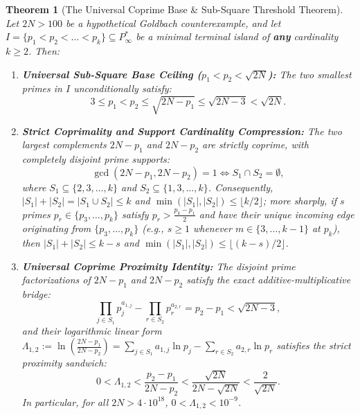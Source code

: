 \documentclass[11pt,a4paper]{article}
\newtheorem{theorem}{Theorem}[section]
\theoremstyle{definition}
\begin{document}
\begin{theorem}[The Universal Coprime Base \& Sub-Square Threshold Theorem]
\label{thm:universal_coprime_base}
Let $2N > 100$ be a hypothetical Goldbach counterexample, and let $I = \{p_1 < p_2 < \dots < p_k\} \subseteq P^*_\infty$ be a minimal terminal island of \textbf{any} cardinality $k \ge 2$. Then:
\begin{enumerate}
    \item \textbf{Universal Sub-Square Base Ceiling ($p_1 < p_2 < \sqrt{2N}$):} The two smallest primes in $I$ unconditionally satisfy:
    \begin{equation}
    \label{eq:universal_p2_bound}
    3 \le p_1 < p_2 \le \sqrt{2N - p_1} \le \sqrt{2N - 3} < \sqrt{2N}.
    \end{equation}
    \item \textbf{Strict Coprimality and Support Cardinality Compression:} The two largest complements $2N - p_1$ and $2N - p_2$ are strictly coprime, with completely disjoint prime supports:
    \begin{equation}
    \label{eq:universal_coprime_supports}
    \gcd(2N - p_1, 2N - p_2) = 1 \iff S_1 \cap S_2 = \emptyset,
    \end{equation}
    where $S_1 \subseteq \{2, 3, \dots, k\}$ and $S_2 \subseteq \{1, 3, \dots, k\}$. Consequently, $|S_1| + |S_2| = |S_1 \cup S_2| \le k$ and $\min(|S_1|, |S_2|) \le \lfloor k / 2 \rfloor$; more sharply, if $s$ primes $p_r \in \{p_3, \dots, p_k\}$ satisfy $p_r > \frac{p_k - p_1}{2}$ and have their unique incoming edge originating from $\{p_3, \dots, p_k\}$ (e.g., $s \ge 1$ whenever $m \in \{3, \dots, k-1\}$ at $p_k$), then $|S_1| + |S_2| \le k - s$ and $\min(|S_1|, |S_2|) \le \lfloor (k - s) / 2 \rfloor$.
    \item \textbf{Universal Coprime Proximity Identity:} The disjoint prime factorizations of $2N - p_1$ and $2N - p_2$ satisfy the exact additive-multiplicative bridge:
    \begin{equation}
    \label{eq:universal_coprime_diff}
    \prod_{j \in S_1} p_j^{a_{1,j}} - \prod_{r \in S_2} p_r^{a_{2,r}} = p_2 - p_1 < \sqrt{2N - 3},
    \end{equation}
    and their logarithmic linear form $\Lambda_{1,2} := \ln\left(\frac{2N - p_1}{2N - p_2}\right) = \sum_{j \in S_1} a_{1,j} \ln p_j - \sum_{r \in S_2} a_{2,r} \ln p_r$ satisfies the strict proximity sandwich:
    \begin{equation}
    \label{eq:universal_lambda12_bound}
    0 < \Lambda_{1,2} < \frac{p_2 - p_1}{2N - p_2} < \frac{\sqrt{2N}}{2N - \sqrt{2N}} < \frac{2}{\sqrt{2N}}.
    \end{equation}
    In particular, for all $2N > 4 \cdot 10^{18}$, $0 < \Lambda_{1,2} < 10^{-9}$.
\end{enumerate}
\end{theorem}
\end{document}
